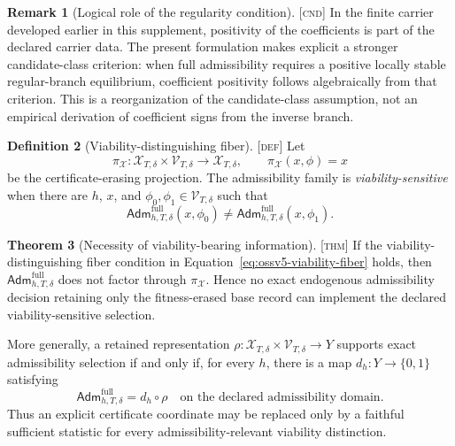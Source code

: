 \documentclass[11pt]{article}
\newcommand{\Defn}{\textsc{[def]}}
\newcommand{\Thm}{\textsc{[thm]}}
\newcommand{\Cnd}{\textsc{[cnd]}}
\theoremstyle{definition}
\newtheorem{definition}{Definition}[section]
\newtheorem{theorem}[definition]{Theorem}
\newtheorem{remark}[definition]{Remark}
\begin{document}
\begin{remark}[Logical role of the regularity condition]
\label{rem:ossv5-regularity-role}
\Cnd{} In the finite carrier developed earlier in this supplement, positivity
of the coefficients is part of the declared carrier data.  The present
formulation makes explicit a stronger candidate-class criterion: when full
admissibility requires a positive locally stable regular-branch equilibrium,
coefficient positivity follows algebraically from that criterion.  This is a
reorganization of the candidate-class assumption, not an empirical derivation
of coefficient signs from the inverse branch.
\end{remark}

\begin{definition}[Viability-distinguishing fiber]
\label{def:ossv5-fitness-fiber}
\Defn{} Let
\begin{equation}
\pi_{\mathcal X}:
\mathcal X_{T,\delta}\times\mathcal V_{T,\delta}
\longrightarrow
\mathcal X_{T,\delta},
\qquad
\pi_{\mathcal X}(x,\phi)=x
\label{eq:ossv5-fitness-erasure}
\end{equation}
be the certificate-erasing projection.  The admissibility family is
\emph{viability-sensitive} when there are $h$, $x$, and
$\phi_0,\phi_1\in\mathcal V_{T,\delta}$ such that
\begin{equation}
\mathsf{Adm}^{\mathrm{full}}_{h,T,\delta}(x,\phi_0)
\neq
\mathsf{Adm}^{\mathrm{full}}_{h,T,\delta}(x,\phi_1).
\label{eq:ossv5-viability-fiber}
\end{equation}
\end{definition}

\begin{theorem}[Necessity of viability-bearing information]
\label{thm:ossv5-nonreducibility}
\Thm{} If the viability-distinguishing fiber condition in
Equation~\eqref{eq:ossv5-viability-fiber} holds, then
$\mathsf{Adm}^{\mathrm{full}}_{h,T,\delta}$ does not factor through
$\pi_{\mathcal X}$.  Hence no exact endogenous admissibility decision retaining
only the fitness-erased base record can implement the declared viability-sensitive
selection.

More generally, a retained representation
$\rho:\mathcal X_{T,\delta}\times\mathcal V_{T,\delta}\to Y$ supports exact
admissibility selection if and only if, for every $h$, there is a map
$d_h:Y\to\{0,1\}$ satisfying
\begin{equation}
\mathsf{Adm}^{\mathrm{full}}_{h,T,\delta}=d_h\circ\rho
\quad\text{on the declared admissibility domain.}
\label{eq:ossv5-exact-factorization}
\end{equation}
Thus an explicit certificate coordinate may be replaced only by a faithful
sufficient statistic for every admissibility-relevant viability distinction.
\end{theorem}
\end{document}
